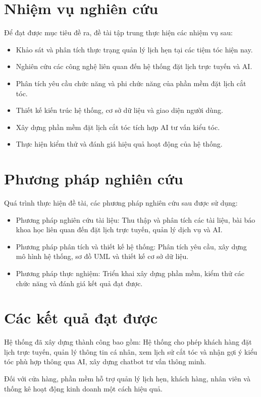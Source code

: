 \section{ Nhiệm vụ nghiên cứu}
Để đạt được mục tiêu đề ra, đề tài tập trung thực hiện các nhiệm vụ sau:
\begin{itemize}
    \item Khảo sát và phân tích thực trạng quản lý lịch hẹn tại các tiệm tóc hiện nay.
    \item Nghiên cứu các công nghệ liên quan đến hệ thống đặt lịch trực tuyến và AI.
    \item Phân tích yêu cầu chức năng và phi chức năng của phần mềm đặt lịch cắt tóc.
    \item Thiết kế kiến trúc hệ thống, cơ sở dữ liệu và giao diện người dùng.
    \item Xây dựng phần mềm đặt lịch cắt tóc tích hợp AI tư vấn kiểu tóc.
    \item Thực hiện kiểm thử và đánh giá hiệu quả hoạt động của hệ thống.
\end{itemize}

\section{Phương pháp nghiên cứu}
Quá trình thực hiện đề tài, các phương pháp nghiên cứu sau được sử dụng:
\begin{itemize}
    \item Phương pháp nghiên cứu tài liệu: Thu thập và phân tích các tài liệu, bài báo khoa học liên quan đến đặt lịch trực tuyến, quản lý dịch vụ và AI.
    \item Phương pháp phân tích và thiết kế hệ thống: Phân tích yêu cầu, xây dựng mô hình hệ thống, sơ đồ UML và thiết kế cơ sở dữ liệu.
    \item Phương pháp thực nghiệm: Triển khai xây dựng phần mềm, kiểm thử các chức năng và đánh giá kết quả đạt được.
\end{itemize}

\section{Các kết quả đạt được}
Hệ thống đã xây dựng thành công bao gồm: 
Hệ thống cho phép khách hàng đặt lịch trực tuyến, quản lý thông tin cá nhân, xem lịch sử cắt tóc và nhận gợi ý kiểu tóc phù hợp thông qua AI, xây dựng chatbot tư vấn thông minh.

Đối với cửa hàng, phần mềm hỗ trợ quản lý lịch hẹn, khách hàng, nhân viên và thống kê hoạt động kinh doanh một cách hiệu quả.

